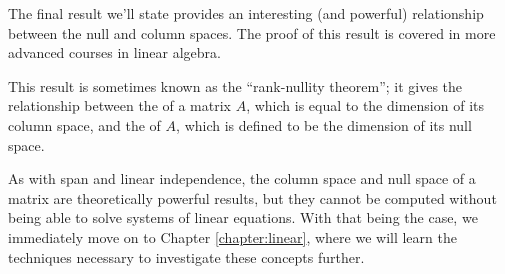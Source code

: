 
\smallskip


\smallskip

The final result we'll state provides an interesting (and powerful) relationship between the null and column spaces. The proof of this result is covered in more advanced courses in linear algebra.

\smallskip


\smallskip

This result is sometimes known as the ``rank-nullity theorem''; it gives the relationship between the  of a matrix $A$, which is equal to the dimension of its column space, and the  of $A$, which is defined to be the dimension of its null space.

As with span and linear independence, the column space and null space of a matrix are theoretically powerful results, but they cannot be computed without being able to solve systems of linear equations. With that being the case, we immediately move on to Chapter \ref{chapter:linear}, where we will learn the techniques necessary to investigate these concepts further.




